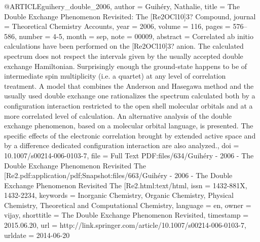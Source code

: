 @ARTICLE{guihery_double_2006,
  author = {Guihéry, Nathalie},
  title = {The {Double} {Exchange} {Phenomenon} {Revisited}: {The} [{Re}2OCl10]3?
	{Compound}},
  journal = {Theoretical Chemistry Accounts},
  year = {2006},
  volume = {116},
  pages = {576--586},
  number = {4-5},
  month = sep,
  note = {00009},
  abstract = {Correlated ab initio calculations have been performed on the [Re2OCl10]3?
	anion. The calculated spectrum does not respect the intervals given
	by the usually accepted double exchange Hamiltonian. Surprisingly
	enough the ground-state happens to be of intermediate spin multiplicity
	(i.e. a quartet) at any level of correlation treatment. A model that
	combines the Anderson and Hasegawa method and the usually used double
	exchange one rationalizes the spectrum calculated both by a configuration
	interaction restricted to the open shell molecular orbitals and at
	a more correlated level of calculation. An alternative analysis of
	the double exchange phenomenon, based on a molecular orbital language,
	is presented. The specific effects of the electronic correlation
	brought by extended active space and by a difference dedicated configuration
	interaction are also analyzed.},
  doi = {10.1007/s00214-006-0103-7},
  file = {Full Text PDF:files/634/Guihéry - 2006 - The Double Exchange Phenomenon Revisited The [Re2.pdf:application/pdf;Snapshot:files/663/Guihéry - 2006 - The Double Exchange Phenomenon Revisited The [Re2.html:text/html},
  issn = {1432-881X, 1432-2234},
  keywords = {Inorganic Chemistry, Organic Chemistry, Physical Chemistry, Theoretical
	and Computational Chemistry},
  language = {en},
  owner = {vijay},
  shorttitle = {The {Double} {Exchange} {Phenomenon} {Revisited}},
  timestamp = {2015.06.20},
  url = {http://link.springer.com/article/10.1007/s00214-006-0103-7},
  urldate = {2014-06-20}
}

